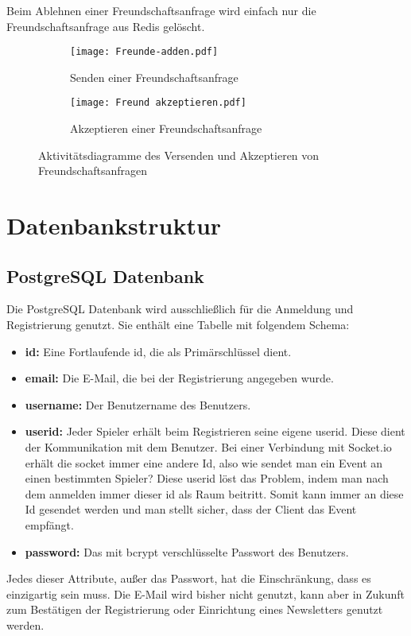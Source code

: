 Beim Ablehnen einer Freundschaftsanfrage wird einfach nur die Freundschaftsanfrage aus Redis gelöscht.

      \begin{figure}[h!]
      \centering
      \begin{subfigure}[b]{0.35\textwidth}
      \centering
  \texttt{[image: Freunde-adden.pdf]}
  \caption{Senden einer Freundschaftsanfrage}
  \label{fig:friend_request}
  \end{subfigure}
  \hspace{10mm}
  \begin{subfigure}[b]{0.3\textwidth}
  \centering
    \texttt{[image: Freund akzeptieren.pdf]}
  \caption{Akzeptieren einer Freundschaftsanfrage}
  \label{fig:friend_request}
  \end{subfigure}
  \caption{Aktivitätsdiagramme des Versenden und Akzeptieren von Freundschaftsanfragen}
  \label{fig:Freunde-backend}
 
\end{figure}

		\section{Datenbankstruktur}
\subsection{PostgreSQL Datenbank}
Die PostgreSQL Datenbank wird ausschließlich für die Anmeldung und Registrierung genutzt. Sie enthält eine Tabelle mit folgendem Schema:
\begin{itemize}
\item \textbf{id:} Eine Fortlaufende id, die als Primärschlüssel dient.
\item \textbf{email:} Die E-Mail, die bei der Registrierung angegeben wurde.
\item \textbf{username:} Der Benutzername des Benutzers.
\item \textbf{userid:} Jeder Spieler erhält beim Registrieren seine eigene userid. Diese dient der Kommunikation mit dem Benutzer. Bei einer Verbindung mit Socket.io erhält die socket immer eine andere Id, also wie sendet man ein Event an einen bestimmten Spieler? Diese userid löst das Problem, indem man nach dem anmelden immer dieser id als Raum beitritt. Somit kann immer an diese Id gesendet werden und man stellt sicher, dass der Client das Event empfängt.
\item \textbf{password:} Das mit bcrypt verschlüsselte Passwort des Benutzers.
\end{itemize}
Jedes dieser Attribute, außer das Passwort, hat die Einschränkung, dass es einzigartig sein muss. Die E-Mail wird bisher nicht genutzt, kann aber in Zukunft zum Bestätigen der Registrierung oder Einrichtung eines Newsletters genutzt werden.

